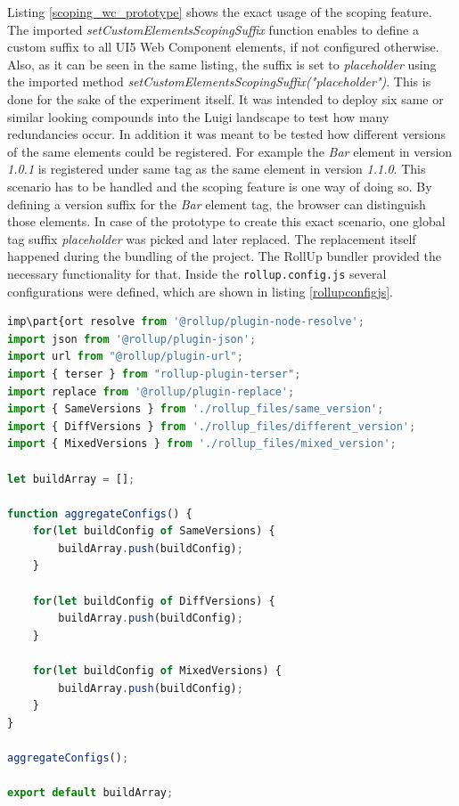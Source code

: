 Listing \ref{scoping_wc_prototype} shows the exact usage of the scoping feature. 
The imported \textit{setCustomElementsScopingSuffix} function enables to define a custom suffix to all UI5 Web Component elements, if not configured otherwise. Also, as it can be seen in the same listing, the suffix is set to \textit{placeholder} using the imported method 
\textit{setCustomElementsScopingSuffix("placeholder")}.
This is done for the sake of the experiment itself. It was intended to deploy six same or similar looking compounds into the Luigi landscape to test how many redundancies occur. In addition it was meant to be tested how different versions of the same elements could be registered. For example the \textit{Bar} element in version \textit{1.0.1} is registered under same tag as the same element in version \textit{1.1.0}. This scenario has to be handled and the scoping feature is one way of doing so.
By defining a version suffix for the \textit{Bar} element tag, the browser can distinguish those elements.
In case of the prototype to create this exact scenario, one global tag suffix \textit{placeholder} was picked and later replaced. The replacement itself happened during the bundling of the project. The RollUp bundler provided the necessary functionality for that.
Inside the \texttt{rollup.config.js} several configurations were defined, which are shown in listing \ref{rollupconfigjs}.

\begin{lstlisting}[language=JavaScript, caption=Content of the \texttt{rollup.config.js}, label=rollupconfigjs]
imp\part{ort resolve from '@rollup/plugin-node-resolve';
import json from '@rollup/plugin-json';
import url from "@rollup/plugin-url";
import { terser } from "rollup-plugin-terser";
import replace from '@rollup/plugin-replace';
import { SameVersions } from './rollup_files/same_version';
import { DiffVersions } from './rollup_files/different_version';
import { MixedVersions } from './rollup_files/mixed_version';

let buildArray = [];

function aggregateConfigs() {
	for(let buildConfig of SameVersions) {
		buildArray.push(buildConfig);
	}
	
	for(let buildConfig of DiffVersions) {
		buildArray.push(buildConfig);
	}
	
	for(let buildConfig of MixedVersions) {
		buildArray.push(buildConfig);
	}
}

aggregateConfigs();

export default buildArray;
\end{lstlisting}


